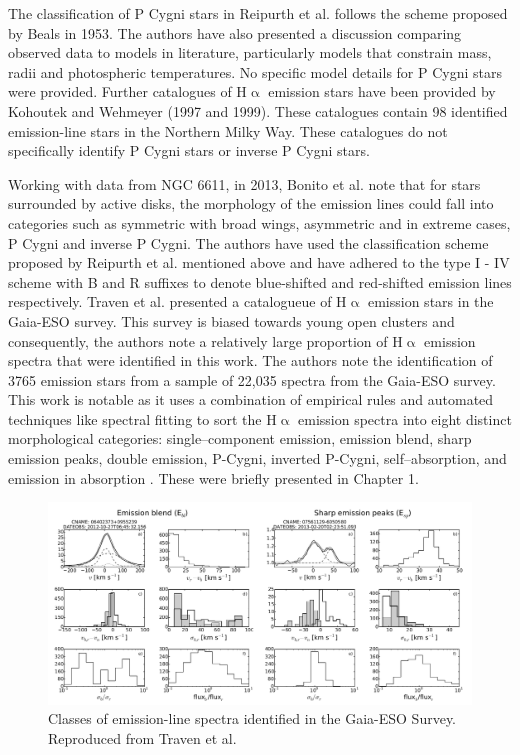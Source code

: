 The classification of P Cygni stars in Reipurth et al. follows the scheme proposed by Beals in 1953\cite{1953PDAO....9....1B}. The authors have also presented a discussion comparing observed data to models in literature, particularly models that constrain mass, radii and photospheric temperatures. No specific model details for P Cygni stars were provided. Further catalogues of H$\upalpha$ emission stars have been provided by Kohoutek and Wehmeyer (1997 and 1999). These catalogues contain 98 identified emission-line stars in the Northern Milky Way. These catalogues do not specifically identify P Cygni stars or inverse P Cygni stars\cite{kohoutek1999catalogue}.

Working with data from NGC 6611, in 2013, Bonito et al. \cite{bonito2013spectroscopic} note that for stars surrounded by active disks, the morphology of the emission lines could fall into categories such as symmetric with broad wings, asymmetric and in extreme cases, P Cygni and inverse P Cygni. The authors have used the classification scheme proposed by Reipurth et al. mentioned above and have adhered to the type I - IV scheme with B and R suffixes to denote blue-shifted and red-shifted emission lines respectively. 
Traven et al. presented a catalogueue of H$\upalpha$ emission stars in the Gaia-ESO survey. This survey is biased towards young open clusters and consequently, the authors note a relatively large proportion of H$\upalpha$ emission spectra that were identified in this work. The authors note the identification of 3765 emission stars from a sample of 22,035 spectra from the Gaia-ESO survey. This work is notable as it uses a combination of empirical rules and automated techniques like spectral fitting to sort the H$\upalpha$ emission spectra into eight distinct morphological categories: single–component emission, emission blend, sharp emission peaks, double emission, P-Cygni, inverted P-Cygni, self–absorption, and emission in absorption \cite{traven2015gaia}. These were briefly presented in Chapter 1.

\begin{figure}[!htb]
\centering
\includegraphics[scale=.50]{figures/gaia eso1.png}
\caption{Classes of emission-line spectra identified in the Gaia-ESO Survey. Reproduced from Traven et al.}
\end{figure}

